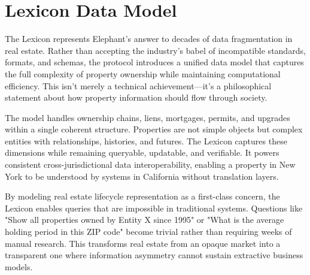 \section{Lexicon Data Model}

The Lexicon represents Elephant's answer to decades of data fragmentation in real estate. Rather than accepting the industry's babel of incompatible standards, formats, and schemas, the protocol introduces a unified data model that captures the full complexity of property ownership while maintaining computational efficiency. This isn't merely a technical achievement—it's a philosophical statement about how property information should flow through society.

The model handles ownership chains, liens, mortgages, permits, and upgrades within a single coherent structure. Properties are not simple objects but complex entities with relationships, histories, and futures. The Lexicon captures these dimensions while remaining queryable, updatable, and verifiable. It powers consistent cross-jurisdictional data interoperability, enabling a property in New York to be understood by systems in California without translation layers.

By modeling real estate lifecycle representation as a first-class concern, the Lexicon enables queries that are impossible in traditional systems. Questions like "Show all properties owned by Entity X since 1995" or "What is the average holding period in this ZIP code" become trivial rather than requiring weeks of manual research. This transforms real estate from an opaque market into a transparent one where information asymmetry cannot sustain extractive business models.

